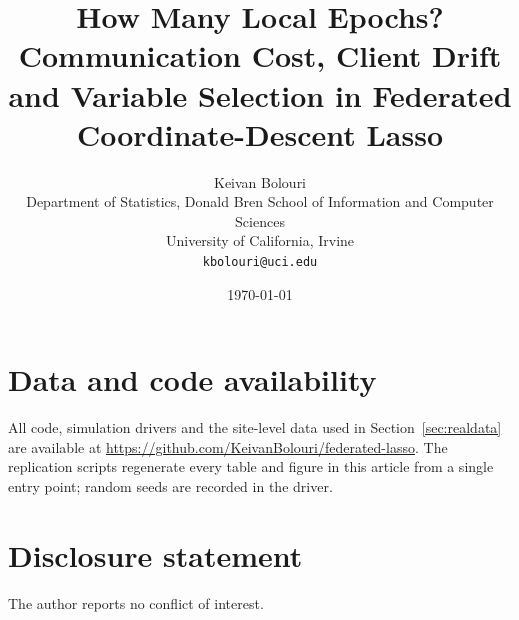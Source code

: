 \documentclass[11pt]{article}
\title{\bfseries How Many Local Epochs? Communication Cost, Client Drift and
Variable Selection in Federated Coordinate-Descent Lasso}
\author{Keivan Bolouri\\[2pt]
\small Department of Statistics, Donald Bren School of Information and Computer Sciences\\
\small University of California, Irvine\\
\small \texttt{kbolouri@uci.edu}}
\date{\today}
\theoremstyle{definition}
\begin{document}
\maketitle












\section*{Data and code availability}
All code, simulation drivers and the site-level data used in
Section~\ref{sec:realdata} are available at
\url{https://github.com/KeivanBolouri/federated-lasso}. The replication
scripts regenerate every table and figure in this article from a single
entry point; random seeds are recorded in the driver.

\section*{Disclosure statement}
The author reports no conflict of interest.



\appendix

\end{document}
